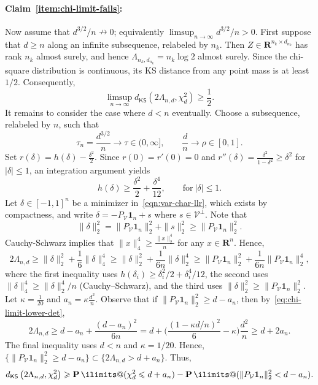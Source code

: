 \documentclass[11pt, letterpaper, hidelinks]{article}
\makeatletter
\newcommand{\R}{\mathbf R}
\newcommand{\cV}{\mathcal{V}}
\newcommand{\1}{\mathbf 1}
\renewcommand{\leq}{\leqslant}
\renewcommand{\geq}{\geqslant}
\renewcommand{\P}{\operatorname*{\mathbf{P}}\ilimits@}
\theoremstyle{plain}
\theoremstyle{definition}
\newcommand{\defn}{=}
\newcommand{\KSDist}[2]{d_{\mathsf{KS}}\left(#1, #2\right)}
\makeatother
\begin{document}
\paragraph{Claim~\ref{item:chi-limit-fails}:}
Now assume that $d^{3/2}/n\nrightarrow 0$; equivalently 
$\limsup_{n \to \infty} d^{3/2}/n > 0$. 
First suppose that $d\geq n$ along an infinite subsequence, relabeled by $n_k$. Then $Z\in\R^{n_k\times d_{n_k}}$ has rank $n_k$ almost surely, and hence $\Lambda_{n_k,d_{n_k}}=n_k\log2$ almost surely. Since the chi-square distribution is continuous, its KS distance from any point mass is at least $1/2$. Consequently,
\[
\limsup_{n \to \infty} \KSDist{2\Lambda_{n, d}}{\chi^2_d} 
\geq \frac12.
\]
It remains to consider the case where $d<n$ eventually.
Choose a subsequence, relabeled by $n$, such that
\[
\tau_n \defn \frac{d^{3/2}}{n}\to \tau\in (0, \infty],
\qquad
\frac{d}{n}\to \rho\in [0, 1].
\]
Set $r(\delta)\defn h(\delta)-\tfrac{\delta^2}{2}$. 
Since $r(0)=r'(0)=0$ and $r''(\delta) = \tfrac{\delta^2}{1-\delta^2} \geq \delta^2$ for $|\delta|\leq 1$, 
an integration argument yields
\[
h(\delta)\geq \frac{\delta^2}{2}+\frac{\delta^4}{12},
\qquad \mbox{for}~|\delta|\leq 1.
\]
Let $\delta\in[-1,1]^n$ be a minimizer in~\cref{eqn:var-char-llr}, which exists by compactness,
and write $\delta=-P_\cV \1_n+s$ where $s\in \cV^\perp$.
Note that 
	\[
	\|\delta\|_2^2 = \|P_\cV \1_n\|_2^2+\|s\|_2^2\geq \|P_\cV \1_n\|_2^2.
	\]
Cauchy-Schwarz implies that $\|x\|_4^4 \geq \tfrac{\|x\|_2^4}{n}$ for any $x \in \R^n$.
Hence,
\begin{equation}\label{eq:chi-limit-lower-det}
	2 \Lambda_{n,d}
\geq
	\|\delta\|_2^2 + \frac{1}{6}\|\delta\|_4^4
	\geq \|\delta\|_2^2 + \frac{1}{6n}\|\delta\|_2^4
	\geq \|P_\cV \1_n\|_2^2 + \frac{1}{6n}\|P_\cV \1_n\|_2^4,
\end{equation}
where the first inequality uses $h(\delta_i) \geq \delta_i^2/2 + \delta_i^4/12$, the second uses $\|\delta\|_4^4 \geq \|\delta\|_2^4/n$ (Cauchy--Schwarz), and the third uses $\|\delta\|_2^2 \geq \|P_\cV \1_n\|_2^2$.
Let $\kappa = \tfrac{1}{20}$ and $a_n = \kappa\tfrac{d^2}{n}$. 
Observe that if $\|P_\cV \1_n\|_2^2\geq d-a_n$, then by~\cref{eq:chi-limit-lower-det},
	\[
	2\Lambda_{n,d}
	\geq
	d-a_n+\frac{(d-a_n)^2}{6n}
=
d+\Big(\frac{(1-\kappa d/n)^2}{6} - \kappa\Big)\frac{d^2}{n} 
\geq d + 2a_n. 
\]
The final inequality uses $d<n$ and $\kappa=1/20$. 
Hence, $\{\|P_\cV \1_n\|_2^2\geq d-a_n\} \subset \{
2\Lambda_{n,d}>d + a_n\}$. Thus, 
\begin{equation}\label{eq:chi-limit-lower-ks}
\KSDist{2\Lambda_{n,d}}{\chi^2_d}
\geq
\P(\chi^2_d\leq d + a_n)-\P(\|P_\cV \1_n\|_2^2<d-a_n).
	\end{equation}
\end{document}
